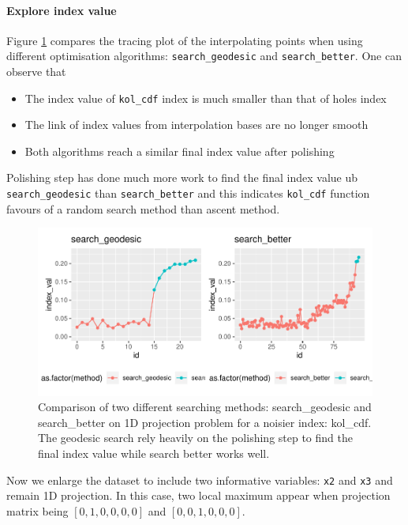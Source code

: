 \documentclass[12pt]{article}
\providecommand{\tightlist}{%
  \setlength{\itemsep}{0pt}\setlength{\parskip}{0pt}}
\begin{document}
\hypertarget{explore-index-value}{%
\paragraph{Explore index value}\label{explore-index-value}}

Figure \ref{kol-cdf} compares the tracing plot of the interpolating
points when using different optimisation algorithms:
\texttt{search\_geodesic} and \texttt{search\_better}. One can observe
that

\begin{itemize}
\tightlist
\item
  The index value of \texttt{kol\_cdf} index is much smaller than that
  of holes index
\item
  The link of index values from interpolation bases are no longer smooth
\item
  Both algorithms reach a similar final index value after polishing
\end{itemize}

Polishing step has done much more work to find the final index value ub
\texttt{search\_geodesic} than \texttt{search\_better} and this
indicates \texttt{kol\_cdf} function favours of a random search method
than ascent method.

\begin{figure}
\centering
\includegraphics{paper_files/figure-latex/kol-cdf-1.pdf}
\caption{\label{kol-cdf}Comparison of two different searching methods:
search\_geodesic and search\_better on 1D projection problem for a
noisier index: kol\_cdf. The geodesic search rely heavily on the
polishing step to find the final index value while search better works
well.}
\end{figure}

Now we enlarge the dataset to include two informative variables:
\texttt{x2} and \texttt{x3} and remain 1D projection. In this case, two
local maximum appear when projection matrix being \([0, 1, 0, 0, 0, 0]\)
and \([0, 0, 1 ,0, 0, 0]\).
\end{document}
